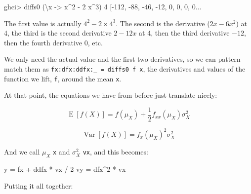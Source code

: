 \documentclass[]{article}
\newenvironment{Shaded}{}{}
\newcommand{\DecValTok}[1]{\textcolor[rgb]{0.25,0.63,0.44}{{#1}}}
\newcommand{\OtherTok}[1]{\textcolor[rgb]{0.00,0.44,0.13}{{#1}}}
\newcommand{\FunctionTok}[1]{\textcolor[rgb]{0.02,0.16,0.49}{{#1}}}
\newcommand{\NormalTok}[1]{{#1}}
\begin{document}
\begin{Shaded}
\begin{Highlighting}[]
\NormalTok{ghci}\FunctionTok{>} \NormalTok{diffs0 (\textbackslash{}x }\OtherTok{->} \NormalTok{x}\FunctionTok{^}\DecValTok{2} \FunctionTok{-} \DecValTok{2} \NormalTok{x}\FunctionTok{^}\DecValTok{3}\NormalTok{) }\DecValTok{4}
\NormalTok{[}\FunctionTok{-}\DecValTok{112}\NormalTok{, }\FunctionTok{-}\DecValTok{88}\NormalTok{, }\FunctionTok{-}\DecValTok{46}\NormalTok{, }\FunctionTok{-}\DecValTok{12}\NormalTok{, }\DecValTok{0}\NormalTok{, }\DecValTok{0}\NormalTok{, }\DecValTok{0}\NormalTok{, }\DecValTok{0}\FunctionTok{...}
\end{Highlighting}
\end{Shaded}

The first value is actually \(4^2 - 2 \times 4^3\). The second is the derivative
(\(2 x - 6x^2\)) at 4, the third is the second derivative \(2 - 12 x\) at 4,
then the third derivative \(-12\), then the fourth derivative \(0\), etc.

We only need the actual value and the first two derivatives, so we can pattern
match them as \texttt{fx:dfx:ddfx:\_\ =\ diffs0\ f\ x}, the derivatives and
values of the function we lift, \texttt{f}, around the mean \texttt{x}.

At that point, the equations we have from before just translate nicely:

\[
\operatorname{E}[f(X)] = f(\mu_X) + \frac{1}{2} f_{xx}(\mu_X) \sigma_X^2
\]

\[
\operatorname{Var}[f(X)] = f_x(\mu_X)^2 \sigma_X^2
\]

And we call \(\mu_X\) \texttt{x} and \(\sigma_X^2\) \texttt{vx}, and this
becomes:

\begin{Shaded}
\begin{Highlighting}[]
\NormalTok{y  }\FunctionTok{=} \NormalTok{fx }\FunctionTok{+} \NormalTok{ddfx }\FunctionTok{*} \NormalTok{vx }\FunctionTok{/} \DecValTok{2}
\NormalTok{vy }\FunctionTok{=} \NormalTok{dfx}\FunctionTok{^}\DecValTok{2} \FunctionTok{*} \NormalTok{vx}
\end{Highlighting}
\end{Shaded}

Putting it all together:
\end{document}
